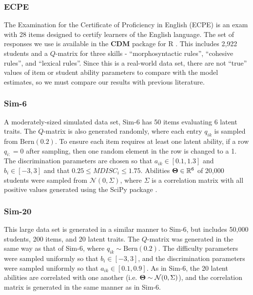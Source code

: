 \subsubsection*{ECPE} The Examination for the Certificate of Proficiency in English (ECPE) is an exam with 28 items designed to certify learners of the English language. The set of responses we use is available in the \textbf{CDM} package for R \cite{cdm}. This includes 2,922 students and a $Q$-matrix for three skills - ``morphosyntactic rules'', ``cohesive rules'', and ``lexical rules''. Since this is a real-world data set, there are not ``true'' values of item or student ability parameters to compare with the model estimates, so we must compare our results with previous literature.

\subsubsection*{Sim-6} A moderately-sized simulated data set, Sim-6 has 50 items evaluating 6 latent traits. The $Q$-matrix is also generated randomly, where each entry $q_{ik}$ is sampled from $\text{Bern}(0.2)$. To ensure each item requires at least one latent ability, if a row $q_{i:} = 0$ after sampling, then one random element in the row is changed to a 1. The discrimination parameters are chosen so that $a_{ik} \in [0.1, 1.3]$ and $b_i \in[-3,3]$ and that $0.25 \leq MDISC_i \leq 1.75$. Abilities $\boldsymbol{\Theta} \in \mathbb{R}^6$ of 20,000 students were sampled from $\mathcal{N}(0, \Sigma)$, where $\Sigma$ is a correlation matrix with all positive values generated using the SciPy package \cite{SciPy}.

\subsubsection*{Sim-20} This large data set is generated in a similar manner to Sim-6, but includes 50,000 students, 200 items, and 20 latent traits. The $Q$-matrix was generated in the same way as that of Sim-6, where $q_{ik} \sim \text{Bern}(0.2)$. The difficulty parameters were sampled uniformly so that $b_i \in [-3,3]$, and the discrimination parameters were sampled uniformly so that $a_{ik} \in [0.1, 0.9]$. As in Sim-6, the 20 latent abilities are correlated with one another (i.e. $\boldsymbol{\Theta} \sim \mathcal{N}(0, \Sigma)$), and the correlation matrix is generated in the same manner as in Sim-6.
